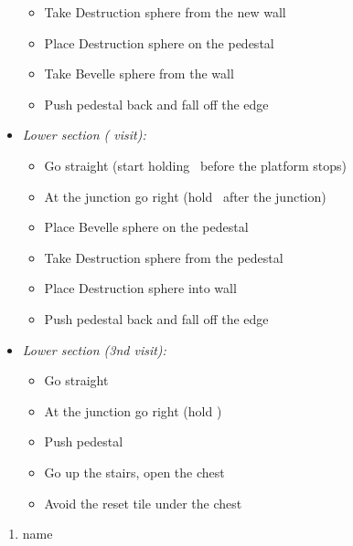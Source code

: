 \begin{trial}
\begin{itemize}
\begin{itemize}
            \item Take Destruction sphere from the new wall
            \item Place Destruction sphere on the pedestal
            \item Take Bevelle sphere from the wall
            \item Push pedestal back and fall off the edge
        \end{itemize}
        \item \textit{Lower section ( visit):}
        \begin{itemize}
            \item Go straight (start holding \Confirm\ before the platform stops)
            \item At the  junction go right (hold \Confirm\ after the  junction)
            \item Place Bevelle sphere on the pedestal
            \item Take Destruction sphere from the pedestal
            \item Place Destruction sphere into wall
            \item Push pedestal back and fall off the edge
        \end{itemize}
        \item \textit{Lower section (3nd visit):}
        \begin{itemize}
            \item Go straight
            \item At the  junction go right (hold \Confirm)
            \item Push pedestal
            \item Go up the stairs, open the chest
            \item Avoid the reset tile under the chest
        \end{itemize}
    \end{itemize}
\end{trial}
\begin{enumerate}[resume]
    \item name \bahamut
\end{enumerate}
\wincb\lossnp\bothnp\winnpsingle\lossnpsingle\bothnpsingle
